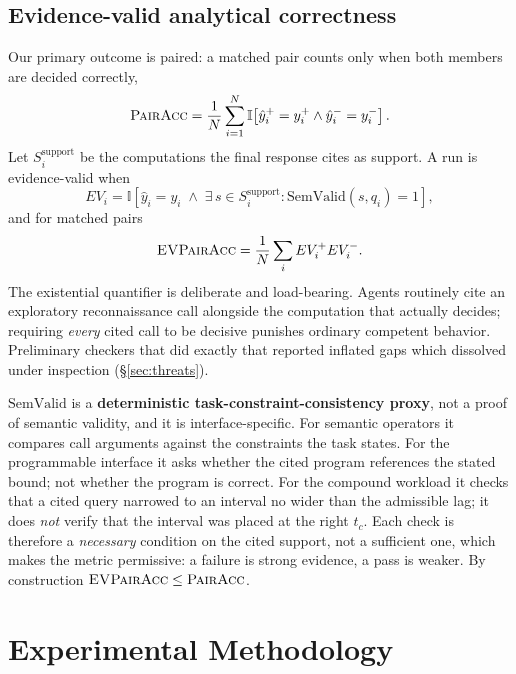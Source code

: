 \documentclass[sigconf,anonymous,review]{acmart}
\newcommand{\pairacc}{\textsc{PairAcc}}
\newcommand{\evpair}{\textsc{EVPairAcc}}
\begin{document}
\subsection{Evidence-valid analytical correctness}
Our primary outcome is paired: a matched pair counts only when both members are decided correctly,
\begin{equation}
\pairacc=\frac{1}{N}\sum_{i=1}^{N}
\mathbb{I}\!\left[\hat y_i^{+}=y_i^{+}\wedge \hat y_i^{-}=y_i^{-}\right].
\end{equation}
Let $S_i^{\text{support}}$ be the computations the final response cites as support. A run is
evidence-valid when
\begin{equation}
EV_i=\mathbb{I}\!\left[\hat y_i=y_i \;\wedge\; \exists\, s\in S_i^{\text{support}}:
\mathrm{SemValid}(s,q_i)=1\right],
\end{equation}
and for matched pairs
\begin{equation}
\evpair=\frac{1}{N}\sum_i EV_i^{+}EV_i^{-} .
\end{equation}
The existential quantifier is deliberate and load-bearing. Agents routinely cite an exploratory
reconnaissance call alongside the computation that actually decides; requiring \emph{every} cited
call to be decisive punishes ordinary competent behavior. Preliminary checkers that did exactly
that reported inflated gaps which dissolved under inspection (\S\ref{sec:threats}).

$\mathrm{SemValid}$ is a \textbf{deterministic task-constraint-consistency proxy}, not a proof of
semantic validity, and it is interface-specific. For semantic operators it compares call arguments
against the constraints the task states. For the programmable interface it asks whether the cited
program references the stated bound; not whether the program is correct. For the compound
workload it checks that a cited query narrowed to an interval no wider than the admissible lag; it
does \emph{not} verify that the interval was placed at the right $t_c$. Each check is therefore a
\emph{necessary} condition on the cited support, not a sufficient one, which makes the metric
permissive: a failure is strong evidence, a pass is weaker. By construction $\evpair\le\pairacc$.

\section{Experimental Methodology}
\end{document}
